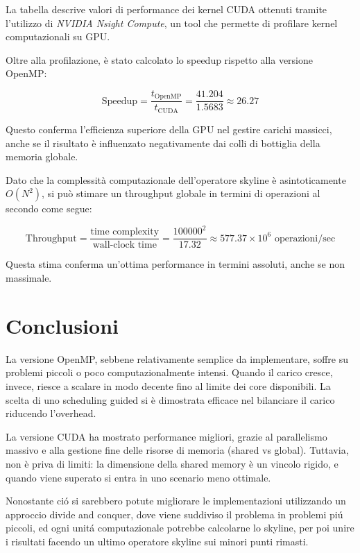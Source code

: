 \documentclass[a4paper,12pt,oneside]{article}
\begin{document}
La tabella descrive valori di performance dei kernel CUDA ottenuti tramite l'utilizzo di \emph{NVIDIA Nsight Compute}, un tool che permette di profilare kernel computazionali su GPU.

Oltre alla profilazione, è stato calcolato lo speedup rispetto alla versione OpenMP:

\[
\text{Speedup} = \frac{t_{\text{OpenMP}}}{t_{\text{CUDA}}} = \frac{41.204}{1.5683} \approx 26.27
\]

Questo conferma l'efficienza superiore della GPU nel gestire carichi massicci, anche se il risultato è influenzato negativamente dai colli di bottiglia della memoria globale.

Dato che la complessità computazionale dell’operatore skyline è asintoticamente $O(N^2)$, si può stimare un throughput globale in termini di operazioni al secondo come segue:

\[
\text{Throughput} = \frac{\text{time complexity}}{\text{wall-clock time}} = \frac{100000^2}{17.32} \approx 577.37 \times 10^6 \text{ operazioni/sec}
\]

Questa stima conferma un’ottima performance in termini assoluti, anche se non massimale.

\section{Conclusioni}
La versione OpenMP, sebbene relativamente semplice da implementare, soffre su problemi piccoli o poco computazionalmente intensi. Quando il carico cresce, invece, riesce a scalare in modo decente fino al limite dei core disponibili. La scelta di uno scheduling guided si è dimostrata efficace nel bilanciare il carico riducendo l’overhead.

La versione CUDA ha mostrato performance migliori, grazie al parallelismo massivo e alla gestione fine delle risorse di memoria (shared vs global). Tuttavia, non è priva di limiti: la dimensione della shared memory è un vincolo rigido, e quando viene superato si entra in uno scenario meno ottimale.

Nonostante ció si sarebbero potute migliorare le implementazioni utilizzando un approccio divide and conquer, dove viene suddiviso il problema in problemi piú piccoli, ed ogni unitá computazionale potrebbe calcolarne lo skyline, per poi unire i risultati facendo un ultimo operatore skyline sui minori punti rimasti.
\end{document}
